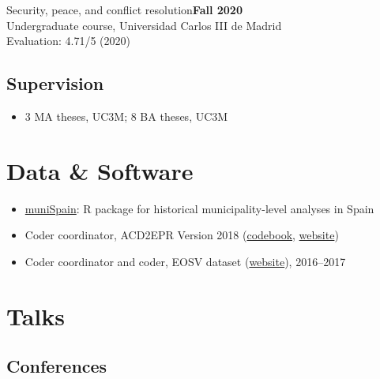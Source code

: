\documentclass[a4paper, 12pt]{article}
\begin{document}
\noindent
Security, peace, and conflict resolution\hfill\textbf{Fall 2020}\\
{\small Undergraduate course, Universidad Carlos III de Madrid}\\
{\small Evaluation: 4.71/5 (2020)}

\vspace{-10pt}
\subsection*{Supervision}

\begin{itemize}[leftmargin=*, nolistsep]
  \item 3 MA theses, UC3M; 8 BA theses, UC3M
\end{itemize}

\section*{Data \& Software}

\begin{itemize}[leftmargin=*, nolistsep]
  \item \href{https://github.com/franvillamil/muniSpain}{muniSpain}: R package for historical municipality-level analyses in Spain
	\item Coder coordinator, ACD2EPR Version 2018 (\href{https://icr.ethz.ch/data/epr/acd2epr/ACD2EPR-2018_Codebook.pdf}{codebook,} \href{https://icr.ethz.ch/data/epr/acd2epr/}{website})
	\item Coder coordinator and coder, EOSV dataset (\href{https://snis.ch/project/civilian-victimization-conflict-escalation/}{website}), 2016--2017
\end{itemize}

\newpage
\section*{Talks}

\subsection*{Conferences}

\end{document}

